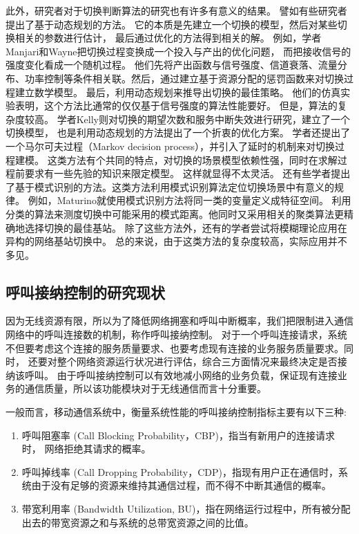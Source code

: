 此外，研究者对于切换判断算法的研究也有许多有意义的结果。
譬如有些研究者提出了基于动态规划的方法。
它的本质是先建立一个切换的模型，然后对某些切换相关的参数进行估计，
最后通过优化的方法得到相关的解。
例如，学者Manjari和Wayne把切换过程变换成一个投入与产出的优化问题，
而把接收信号的强度变化看成一个随机过程\cite{513159}。
他们先将产出函数与信号强度、信道衰落、流量分布、功率控制等条件相关联。然后，通过建立基于资源分配的惩罚函数来对切换过程建立数学模型。
最后，利用动态规划来推导出切换的最佳策略。
他们的仿真实验表明，这个方法比通常的仅仅基于信号强度的算法性能要好。
但是，算法的复杂度较高。
学者Kelly则对切换的期望次数和服务中断失效进行研究，建立了一个切换模型，
也是利用动态规划的方法提出了一个折衷的优化方案\cite{618185}。
学者还提出了一个马尔可夫过程（Markov decision process），并引入了延时的机制来对切换过程建模\cite{504996}。
这类方法有个共同的特点，对切换的场景模型依赖性强，同时在求解过程前要求有一些先验的知识来限定模型。
这样就显得不太灵活。
还有些学者提出了基于模式识别的方法。这类方法利用模式识别算法定位切换场景中有意义的规律。
例如，Maturino就使用模式识别方法将同一类的变量定义成特征空间\cite{345157}。
利用分类的算法来测度切换中可能采用的模式距离。他同时又采用相关的聚类算法更精确地选择切换的最佳基站。
除了这些方法外，还有的学者尝试将模糊理论应用在异构的网络基站切换中\cite{5189770}\cite{5672711}。
总的来说，由于这类方法的复杂度较高，实际应用并不多见。

\subsection{呼叫接纳控制的研究现状}
因为无线资源有限，所以为了降低网络拥塞和呼叫中断概率，我们把限制进入通信网络中的呼叫连接数的机制，称作呼叫接纳控制。
对于一个呼叫连接请求，系统不但要考虑这个连接的服务质量要求、也要考虑现有连接的业务服务质量要求。同时，
还要对整个网络资源运行状况进行评估，综合三方面情况来最终决定是否接纳该呼叫\cite{Ahmed2005}\cite{Ghaderi_Boutaba_2006}。
由于呼叫接纳控制可以有效地减小网络的业务负载，保证现有连接业务的通信质量，所以该功能模块对于无线通信而言十分重要。

一般而言，移动通信系统中，衡量系统性能的呼叫接纳控制指标主要有以下三种:
\begin{enumerate}[(1)]
\item 呼叫阻塞率  (Call Blocking Probability，CBP)，指当有新用户的连接请求时， 网络拒绝其请求的概率。
\item 呼叫掉线率  (Call Dropping Probability，CDP)，指现有用户正在通信时，系统由于没有足够的资源来维持其通信过程，而不得不中断其通信的概率。
\item 带宽利用率 (Bandwidth Utilization, BU)，指在网络运行过程中，所有被分配出去的带宽资源之和与系统的总带宽资源之间的比值。
\end{enumerate}

